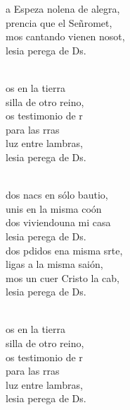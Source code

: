 \begin{cancion}
\jump
	a Espeza nolena de alegra,\\
	prencia que el Señromet, \\
	mos cantando vienen nosot,\\
	lesia perega de Ds.\\\jump\\
	\begin{chorus}%
	os en la tierra \\
	silla de otro reino,\\
	os testimonio de r\\
	 para las rras\\
	luz entre lambras,\\
	lesia perega de Ds.\\
	\end{chorus}%
	\jump\\
	dos nacs en sólo bautio,\\
	unis en la misma coón\\
	dos viviendouna mi casa \\
	lesia perega de Ds.\\
\jump
	dos pdidos ena misma srte,\\
	ligas a la misma saión,\\
	mos un cuer Cristo la cab,\\
	lesia perega de Ds.\\\jump\\
	\begin{chorus}%
	os en la tierra \\
	silla de otro reino,\\
	os testimonio de r\\
	 para las rras\\
	luz entre lambras,\\
	lesia perega de Ds.\\
	\end{chorus}%
	\jump\\
\end{cancion}%
